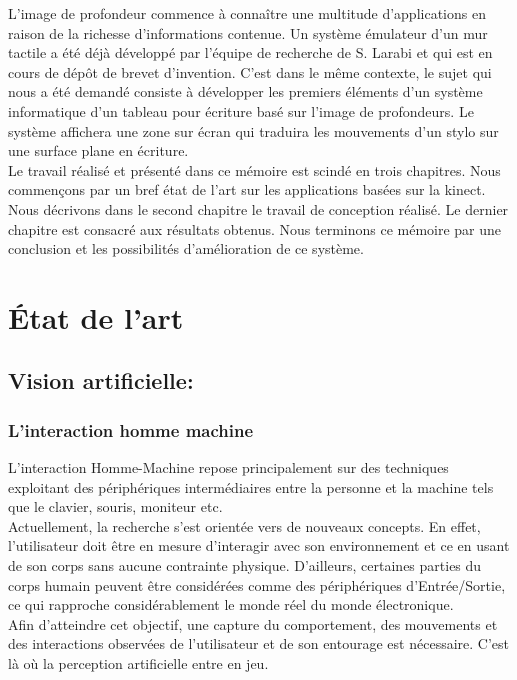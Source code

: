\documentclass[12pt,a4paper,oneside]{book}
\begin{document}
	L'image de profondeur commence à connaître une multitude d'applications en raison de la richesse d'informations contenue. Un système émulateur d'un mur tactile a été déjà développé par l'équipe de recherche de S. Larabi et qui est en cours de dépôt de brevet d'invention.
	C'est dans le même contexte, le sujet qui nous a été demandé consiste à développer les premiers éléments d'un système informatique d'un tableau pour écriture basé sur l'image de profondeurs. Le système affichera une zone sur écran qui traduira les mouvements d'un stylo sur une surface plane en écriture.\\
	
	Le travail réalisé et présenté dans ce mémoire est scindé en trois chapitres. Nous commençons par un bref état de l'art sur les applications basées sur la kinect. Nous décrivons dans le second chapitre le travail de conception réalisé. Le dernier chapitre est consacré aux résultats obtenus. Nous terminons ce mémoire par une conclusion et les possibilités d'amélioration de ce système.
	
	\chapter{État de l'art}
	
	
	
	\section{Vision artificielle:}
	
	\subsection{L'interaction homme machine}
	L’interaction Homme-Machine repose principalement sur des techniques exploitant des périphériques intermédiaires entre la personne et la machine tels que le clavier, souris, moniteur etc.\\
	Actuellement, la recherche s'est orientée vers de nouveaux concepts. En effet, l’utilisateur doit être en mesure d'interagir avec son environnement et ce en usant de son corps sans aucune contrainte physique. D’ailleurs, certaines parties du corps humain peuvent être considérées comme  des périphériques d’Entrée/Sortie, ce qui rapproche considérablement le monde réel du monde électronique.\\
	Afin d'atteindre cet objectif, une capture du comportement, des mouvements et des interactions observées  de l’utilisateur et de son entourage est nécessaire. C’est là où la perception artificielle entre en jeu.
	
\end{document}
